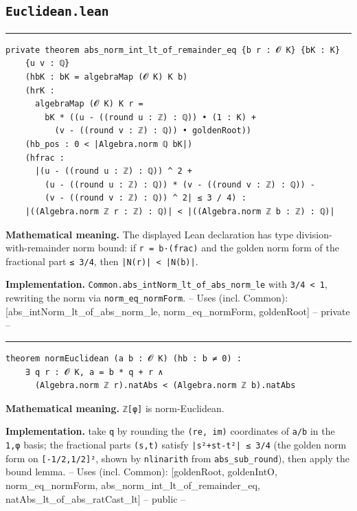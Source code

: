 \documentclass[UTF8,a4paper,11pt,fontset=fandol]{ctexart}
\theoremstyle{definition}
\newcommand{\statementsep}{\par\medskip\hrule\medskip}
\begin{document}
\subsection{\texttt{Euclidean.lean}}

\statementsep
\begin{verbatim}
private theorem abs_norm_int_lt_of_remainder_eq {b r : 𝓞 K} {bK : K}
    {u v : ℚ}
    (hbK : bK = algebraMap (𝓞 K) K b)
    (hrK :
      algebraMap (𝓞 K) K r =
        bK * ((u - ((round u : ℤ) : ℚ)) • (1 : K) +
          (v - ((round v : ℤ) : ℚ)) • goldenRoot))
    (hb_pos : 0 < |Algebra.norm ℚ bK|)
    (hfrac :
      |(u - ((round u : ℤ) : ℚ)) ^ 2 +
        (u - ((round u : ℤ) : ℚ)) * (v - ((round v : ℤ) : ℚ)) -
        (v - ((round v : ℤ) : ℚ)) ^ 2| ≤ 3 / 4) :
    |((Algebra.norm ℤ r : ℤ) : ℚ)| < |((Algebra.norm ℤ b : ℤ) : ℚ)|
\end{verbatim}
\noindent\textbf{Mathematical meaning.} The displayed Lean declaration has type division-with-remainder norm bound: if \texttt{r = b·(frac)} and the golden norm form of the fractional part \texttt{≤ 3/\allowbreak{}4}, then \texttt{|N(r)| < |N(b)|}.\par
\noindent\textbf{Implementation.} \texttt{Common.\allowbreak{}abs\_\allowbreak{}intNorm\_\allowbreak{}lt\_\allowbreak{}of\_\allowbreak{}abs\_\allowbreak{}norm\_\allowbreak{}le} with \texttt{3/\allowbreak{}4 < 1}, rewriting the norm via \texttt{norm\_\allowbreak{}eq\_\allowbreak{}normForm}. -- Uses (incl. Common): [abs\_\allowbreak{}intNorm\_\allowbreak{}lt\_\allowbreak{}of\_\allowbreak{}abs\_\allowbreak{}norm\_\allowbreak{}le, norm\_\allowbreak{}eq\_\allowbreak{}normForm, goldenRoot] -- private --\par
\statementsep
\begin{verbatim}
theorem normEuclidean (a b : 𝓞 K) (hb : b ≠ 0) :
    ∃ q r : 𝓞 K, a = b * q + r ∧
      (Algebra.norm ℤ r).natAbs < (Algebra.norm ℤ b).natAbs
\end{verbatim}
\noindent\textbf{Mathematical meaning.} \texttt{ℤ[φ]} is norm-Euclidean.\par
\noindent\textbf{Implementation.} take \texttt{q} by rounding the \texttt{(re, im)} coordinates of \texttt{a/\allowbreak{}b} in the \texttt{1,φ} basis; the fractional parts \texttt{(s,t)} satisfy \texttt{|s²+st-t²| ≤ 3/\allowbreak{}4} (the golden norm form on \texttt{[-1/\allowbreak{}2,1/\allowbreak{}2]²}, shown by \texttt{nlinarith} from \texttt{abs\_\allowbreak{}sub\_\allowbreak{}round}), then apply the bound lemma. -- Uses (incl. Common): [goldenRoot, goldenIntO, norm\_\allowbreak{}eq\_\allowbreak{}normForm, abs\_\allowbreak{}norm\_\allowbreak{}int\_\allowbreak{}lt\_\allowbreak{}of\_\allowbreak{}remainder\_\allowbreak{}eq, natAbs\_\allowbreak{}lt\_\allowbreak{}of\_\allowbreak{}abs\_\allowbreak{}ratCast\_\allowbreak{}lt] -- public --\par
\end{document}
